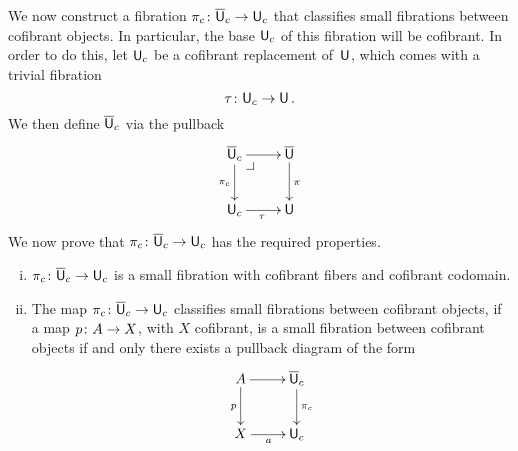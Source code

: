 \documentclass[reqno,10pt,a4paper,oneside,draft]{amsart}
\begin{document}
\bigskip

We now  construct a fibration $\pi_c \colon \overline{\mathsf{U}}_c \to \mathsf{U}_c$ that classifies small fibrations between 
cofibrant objects. In particular, the base $\mathsf{U}_c$ of this fibration will be cofibrant.  In order to do this, let $\mathsf{U}_c$ be a cofibrant replacement of~$\mathsf{U}$,  which comes with a trivial fibration
\begin{equation}
\label{equ:ucu}
\tau \colon \mathsf{U}_c \rightarrow \mathsf{U} \, .
\end{equation}
We then define $\overline{\mathsf{U}}_c$ via the pullback
\begin{equation}
\label{equ:def-of-pi-c}
\begin{gathered}
\xymatrix{
\UU_c \ar[d]_{\pi_c} \ar[r] \drpullback & \UU \ar[d]^{\pi}  \\
\U_c \ar[r]_\tau & \U}
\end{gathered}
\end{equation}
We now prove that $\pi_c \colon \overline{\mathsf{U}}_c \to \mathsf{U}_c$ has the required properties.

\begin{theorem} \label{thm:universe-uc} 
\hfill 
\begin{enumerate}[(i)] 
\item $\pi_c \colon \overline{\mathsf{U}}_c \to \mathsf{U}_c$ is a small fibration with cofibrant fibers and cofibrant codomain. 
\item The map $\pi_c \colon \overline{\mathsf{U}}_c \to \mathsf{U}_c$ classifies small fibrations between cofibrant
objects, \ie if a map $p \colon A \to X$, with $X$ cofibrant, is a small fibration between cofibrant objects
if and only there exists a pullback diagram of the form
\[
\xymatrix{
A \ar[r] \ar[d]_p & \UU_c \ar[d]^{\pi_c} \\
X \ar[r]_a & \U_c }
\]
\end{enumerate}
\end{theorem}
\end{document}
